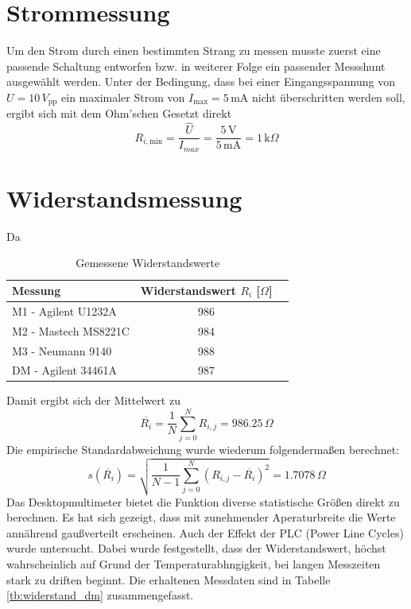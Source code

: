 \section{Strommessung}
Um den Strom durch einen bestimmten Strang zu messen musste zuerst eine passende Schaltung entworfen bzw. in weiterer Folge ein passender Messshunt ausgewählt werden. Unter der Bedingung, dass bei einer Eingangsspannung von $U=10\,V_{\text{pp}}$ ein maximaler Strom von $I_{\text{max}}=5\,$mA nicht überschritten werden soll, ergibt sich mit dem Ohm'schen Gesetzt direkt
\begin{equation}
	R_{i,\text{min}} = \frac{\hat{U}}{I_{max}} = \frac{5\,\text{V}}{5\,\text{mA}} = 1\,\text{k}\Omega
	\label{eq:widerstandsdim}
\end{equation}
\section{Widerstandsmessung}
Da 
\begin{table}[h]
	\centering
	\begin{tabular}{|l|c|c|}
	\hline 
	Messung & Widerstandswert $R_i$ [$\Omega$]\\ 
	\hline 
	M1 - Agilent U1232A & 986		\\ 
	\hline 
	M2 - Mastech MS8221C & 984		\\ 
	\hline 
	M3 - Neumann 9140 & 988		\\ 
	\hline 
	DM - Agilent 34461A & 987		\\ 
	\hline 
	\end{tabular}
	\caption{Gemessene Widerstandswerte}
	\label{tb:widerstandswerte}
\end{table} \noindent
Damit ergibt sich der Mittelwert zu
\begin{equation}
	\overline{R_i} = \frac{1}{N} \sum\limits_{j=0}^N R_{i,j} = 986.25\, \Omega
	\label{eq:mittelw}
\end{equation}
Die empirische Standardabweichung wurde wiederum folgendermaßen berechnet:
\begin{equation}
	s(\overline{R_i}) = \sqrt{\frac{1}{N-1} \sum\limits_{j=0}^N (R_{i,j} - \overline{R_i})^2} = 1.7078\, \Omega 
	\label{eq:stdabw}
\end{equation}
Das Desktopmultimeter bietet die Funktion diverse statistische Größen direkt zu berechnen. Es hat sich gezeigt, dass mit zunehmender Aperaturbreite die Werte annährend gaußverteilt erscheinen. Auch der Effekt der PLC (Power Line Cycles) wurde untersucht. Dabei wurde festgestellt, dass der Widerstandswert, höchst wahrscheinlich auf Grund der Temperaturabhngigkeit, bei langen Messzeiten stark zu driften beginnt. Die erhaltenen Messdaten sind in Tabelle \ref{tb:widerstand_dm} zusammengefasst.
